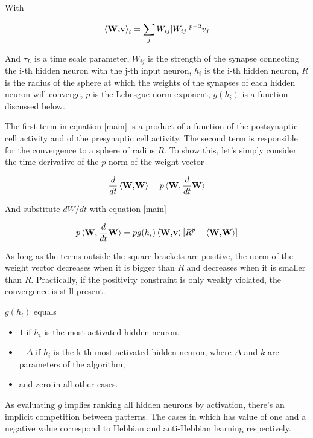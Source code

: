 \documentclass[a4paper]{report}
\begin{document}
With

\begin{equation}
    \braket{\textbf{W,v}}_i = \sum_j W_{ij} |W_{ij}|^{p-2} v_j
\end{equation}

And $\tau_L$ is a time scale parameter,  $W_{ij}$ is the strength of the synapse connecting the i-th hidden neuron with the j-th input neuron, $h_i$ is the i-th hidden neuron, $R$ is the radius of the sphere at which the weights of the synapses of each hidden neuron will converge, $p$ is the Lebesgue norm exponent, $g(h_i)$ is a function discussed below.

The first term in equation \ref{main} is a product of a function of the postsynaptic cell activity and of the presynaptic cell activity.
The second term is responsible for the convergence to a sphere of radius $R$.
To show this, let's simply consider the time derivative of the $p$ norm of the weight vector

\begin{equation}
	\frac{d}{dt} \braket{\textbf{W,W}} = p \braket{\textbf{W}, \frac{d}{dt}\textbf{W}}
\end{equation}

And substitute $dW/dt$ with equation \ref{main}

\begin{equation}
	p \braket{\textbf{W}, \frac{d}{dt}\textbf{W}} = pg(h_i)\braket{\textbf{W,v}}[R^p-\braket{\textbf{W,W}}]
\end{equation}

As long as the terms outside the square brackets are positive, the norm of the weight vector decreases when it is bigger than $R$ and decreases when it is smaller than $R$. Practically, if the positivity constraint is only weakly violated, the convergence is still present.

$g(h_i)$ equals
\begin{itemize}
    \item $1$ if $h_i$ is the most-activated hidden neuron,
    \item $-\Delta$ if $h_i$ is the k-th most activated hidden neuron, where $\Delta$ and $k$ are parameters of the algorithm,
    \item and zero in all other cases.
\end{itemize}

As evaluating $g$ implies ranking all hidden neurons by activation, there's an implicit competition between patterns.
The cases in which has value of one and a negative value correspond to Hebbian and anti-Hebbian learning respectively.
\end{document}
